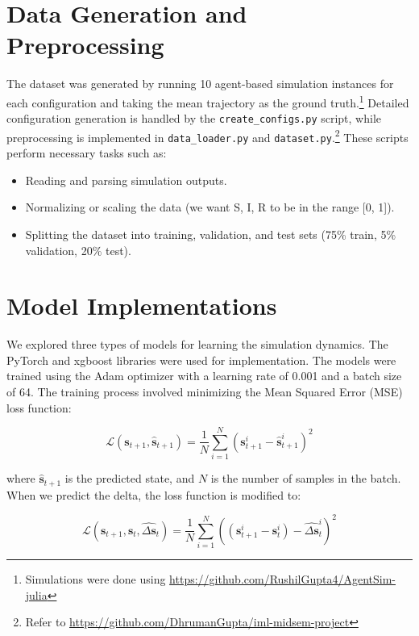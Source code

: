\documentclass[a4paper]{article}
\begin{document}
\section{Data Generation and Preprocessing}
The dataset was generated by running 10 agent-based simulation instances for each configuration and taking the mean trajectory as the ground truth.\footnote{Simulations were done using \url{https://github.com/RushilGupta4/AgentSim-julia}} Detailed configuration generation is handled by the \texttt{create\_configs.py} script, while preprocessing is implemented in \texttt{data\_loader.py} and \texttt{dataset.py}.\footnote{Refer to \url{https://github.com/DhrumanGupta/iml-midsem-project}} These scripts perform necessary tasks such as:
\begin{itemize}[noitemsep]
    \item Reading and parsing simulation outputs.
    \item Normalizing or scaling the data (we want S, I, R to be in the range [0, 1]).
    \item Splitting the dataset into training, validation, and test sets (75\% train, 5\% validation, 20\% test).
\end{itemize}

\section{Model Implementations}
We explored three types of models for learning the simulation dynamics. The PyTorch and xgboost libraries were used for implementation. The models were trained using the Adam optimizer with a learning rate of 0.001 and a batch size of 64. The training process involved minimizing the Mean Squared Error (MSE) loss function:

\begin{equation*}
    \mathcal{L}(\mathbf{s}_{t+1}, \hat{\mathbf{s}}_{t+1}) = \frac{1}{N} \sum_{i=1}^{N} (\mathbf{s}_{t+1}^i - \hat{\mathbf{s}}_{t+1}^i)^2
\end{equation*}

\noindent where $\hat{\mathbf{s}}_{t+1}$ is the predicted state, and $N$ is the number of samples in the batch. When we predict the delta, the loss function is modified to:

\begin{equation*}
    \mathcal{L}(\mathbf{s}_{t + 1}, \mathbf{s}_t, \hat{\Delta \mathbf{s}}_t) = \frac{1}{N} \sum_{i=1}^{N} \left((\mathbf{s}_{t + 1}^i - \mathbf{s}_t^i) - \hat{\Delta \mathbf{s}}_t^i\right)^2
\end{equation*}
\end{document}
